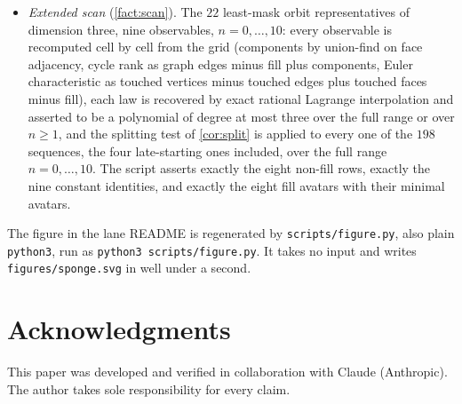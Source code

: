\documentclass[11pt]{amsart}
\theoremstyle{definition}
\theoremstyle{remark}
\begin{document}
\begin{itemize}
\item \emph{Extended scan} (\cref{fact:scan}). The $22$ least-mask orbit representatives of dimension three, nine observables, $n=0,\dots,10$: every observable is recomputed cell by cell from the grid (components by union-find on face adjacency, cycle rank as graph edges minus fill plus components, Euler characteristic as touched vertices minus touched edges plus touched faces minus fill), each law is recovered by exact rational Lagrange interpolation and asserted to be a polynomial of degree at most three over the full range or over $n \ge 1$, and the splitting test of \cref{cor:split} is applied to every one of the $198$ sequences, the four late-starting ones included, over the full range $n=0,\dots,10$. The script asserts exactly the eight non-fill rows, exactly the nine constant identities, and exactly the eight fill avatars with their minimal avatars.
\end{itemize}

The figure in the lane README is regenerated by \texttt{scripts/figure.py}, also plain \texttt{python3}, run as \texttt{python3 scripts/figure.py}. It takes no input and writes \texttt{figures/sponge.svg} in well under a second.

\section*{Acknowledgments}

This paper was developed and verified in collaboration with Claude (Anthropic). The author takes sole responsibility for every claim.
\end{document}
